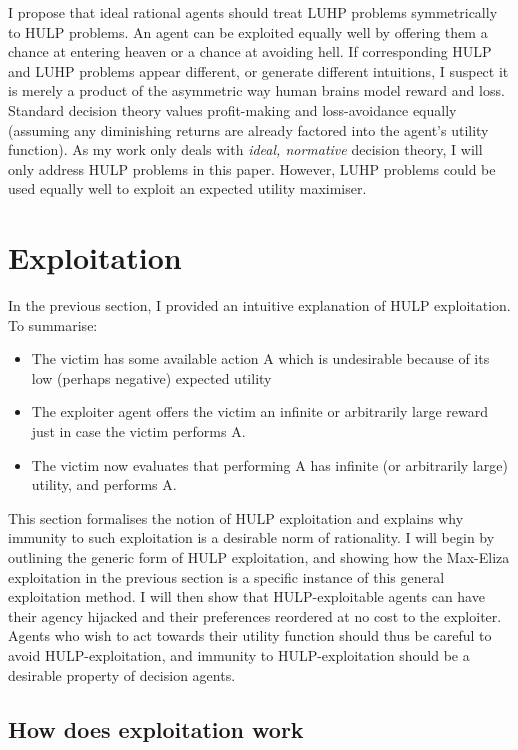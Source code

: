 \documentclass{article}
\begin{document}
I propose that ideal rational agents should treat LUHP problems symmetrically to HULP problems. An agent can be exploited equally well by offering them a chance at entering heaven or a chance at avoiding hell. If corresponding HULP and LUHP problems appear different, or generate different intuitions, I suspect it is merely a product of the asymmetric way human brains model reward and loss. Standard decision theory values profit-making and loss-avoidance equally (assuming any diminishing returns are already factored into the agent's utility function). As my work only deals with \textit{ideal, normative} decision theory, I will only address HULP problems in this paper. However, LUHP problems could be used equally well to exploit an expected utility maximiser.

\section{Exploitation}

In the previous section, I provided an intuitive explanation of HULP exploitation. To summarise:

\begin{itemize}
\item The victim has some available action A which is undesirable because of its low (perhaps negative) expected utility
\item The exploiter agent offers the victim an infinite or arbitrarily large reward just in case the victim performs A. 
\item The victim now evaluates that performing A has infinite (or arbitrarily large) utility, and performs A.
\end{itemize}

This section formalises the notion of HULP exploitation and explains why immunity to such exploitation is a desirable norm of rationality. I will begin by outlining the generic form of HULP exploitation, and showing how the Max-Eliza exploitation in the previous section is a specific instance of this general exploitation method. I will then show that HULP-exploitable agents can have their agency hijacked and their preferences reordered at no cost to the exploiter. Agents who wish to act towards their utility function should thus be careful to avoid HULP-exploitation, and immunity to HULP-exploitation should be a desirable property of decision agents.

\subsection{How does exploitation work}
\end{document}
